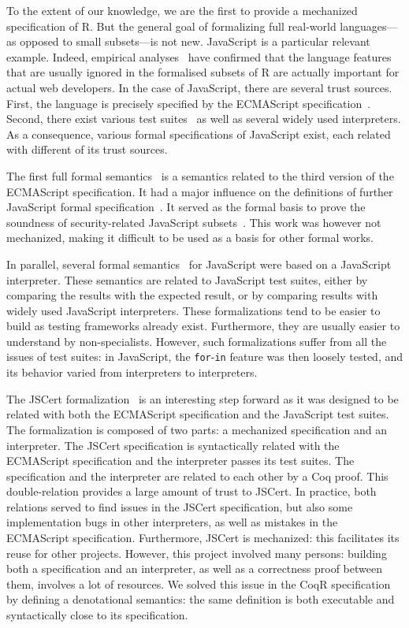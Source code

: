 \documentclass[
    sigplan,
    10pt,
    review, %
    natbib=false %
 ]{acmart}
\begin{document}
To the extent of our knowledge,
we are the first to provide a mechanized specification of R.
But the general goal of formalizing full real-world languages—%
as opposed to small subsets—is not new.
%
JavaScript is a particular relevant example.
Indeed, empirical analyses~\parencite{RichardsHBV11}
have confirmed that the language features
that are usually ignored in the formalised subsets of R
are actually important for actual web developers.
%
In the case of JavaScript, there are several trust sources.
First, the language is precisely specified by the ECMAScript specification~\parencite{es2019}.
Second, there exist various test suites~\parencite{test262, mozillatests}
as well as several widely used interpreters.
As a consequence, various formal specifications of JavaScript exist,
each related with different of its trust sources.

The first full formal semantics~\parencite{aplas08}
is a semantics related to the third version of the ECMAScript specification.
It had a major influence on the definitions of further JavaScript formal
specification~\parencite{ses, jscert, popl12-Towards, usenix}.
It served as the formal basis to prove the soundness of security-related
JavaScript subsets~\parencite{MMT-CSF-TR09, mmt-esorics09, mmt-oakland10}.
This work was however not mechanized, making it difficult to be used
as a basis for other formal works.

In parallel, several formal semantics~\parencite{js-ml, Guha2010, Politz:S5, kjs}
for JavaScript were based on a JavaScript interpreter.
These semantics are related to JavaScript test suites,
either by comparing the results with the expected result,
or by comparing results with widely used JavaScript interpreters.
These formalizations tend to be easier to build
as testing frameworks already exist.
Furthermore, they are usually easier to understand by non-specialists.
However, such formalizations suffer from all the issues of test suites:
in JavaScript, the \texttt{for}-\texttt{in}
feature was then loosely tested,
and its behavior varied from interpreters to interpreters.

The JSCert formalization~\parencite{jscert, popl14jscert}
is an interesting step forward as it was designed
to be related with both the ECMAScript specification and the JavaScript test suites.
The formalization is composed of two parts:
a mechanized specification and an interpreter.
The JSCert specification is syntactically related with the ECMAScript specification
and the interpreter passes its test suites.
The specification and the interpreter are related to each other by a Coq proof.
This double-relation provides a large amount of trust to JSCert.
In practice, both relations served to find issues in the JSCert specification,
but also some implementation bugs in other interpreters,
as well as mistakes in the ECMAScript specification.
Furthermore, JSCert is mechanized:
this facilitates its reuse for other projects.
However, this project involved many persons:
building both a specification and an interpreter,
as well as a correctness proof between them, involves a lot of resources.
We solved this issue in the CoqR specification
by defining a denotational semantics:
the same definition is both executable and syntactically close to its specification.
\end{document}
